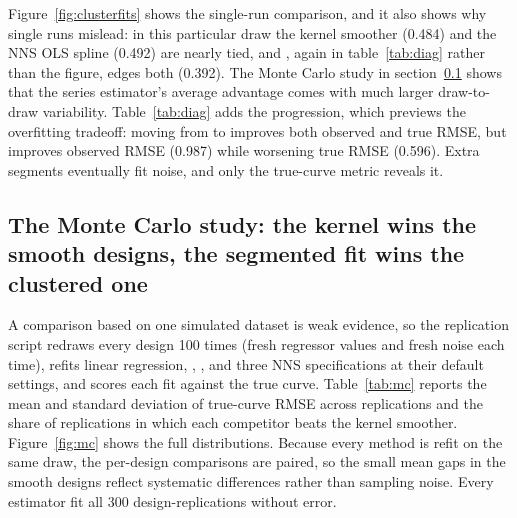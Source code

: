 Figure~\ref{fig:clusterfits} shows the single-run comparison, and it also
shows why single runs mislead: in this particular draw the kernel smoother
(0.484) and the NNS OLS spline (0.492) are nearly tied, and , again in table~\ref{tab:diag} rather than the figure, edges both
(0.392).  The Monte Carlo study in section~\ref{sec:mc}
shows that the series estimator's average advantage comes with much larger
draw-to-draw variability.  Table~\ref{tab:diag} adds the 
progression, which previews the overfitting tradeoff: moving from
 to  improves both observed and true RMSE, but
 improves observed RMSE (0.987) while worsening true RMSE
(0.596).  Extra segments eventually fit noise, and only the true-curve metric
reveals it.

\subsection{The Monte Carlo study: the kernel wins the smooth designs, the segmented fit wins the clustered one}
\label{sec:mc}

A comparison based on one simulated dataset is weak evidence, so the
replication script redraws every design 100 times (fresh regressor values and
fresh noise each time), refits linear regression, ,
, and three NNS specifications at their default
settings, and scores each fit against the true curve.  Table~\ref{tab:mc}
reports the mean and standard deviation of true-curve RMSE across replications
and the share of replications in which each competitor beats the kernel
smoother.  Figure~\ref{fig:mc} shows the full distributions.  Because every
method is refit on the same draw, the per-design comparisons are paired, so
the small mean gaps in the smooth designs reflect systematic differences
rather than sampling noise.  Every estimator fit all 300 design-replications
without error.

